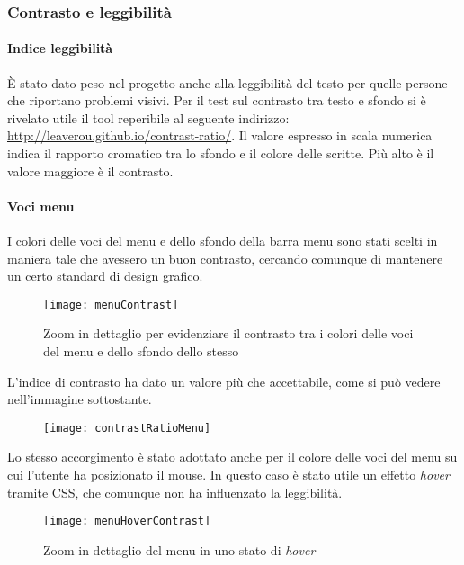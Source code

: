\newpage

\subsubsection{Contrasto e leggibilit\`a}

\paragraph*{Indice leggibilità}\`E stato dato peso nel progetto anche alla leggibilit\`a del testo per quelle persone che riportano problemi visivi. Per il test sul contrasto tra testo e sfondo si \`e rivelato utile il tool reperibile al seguente indirizzo: \url{http://leaverou.github.io/contrast-ratio/}.
Il valore espresso in scala numerica indica il rapporto cromatico tra lo sfondo e il colore delle scritte. Più alto \`e il valore maggiore è il contrasto.

\paragraph*{Voci menu}I colori delle voci del menu e dello sfondo della barra menu sono stati scelti in maniera tale che avessero un buon contrasto, cercando comunque di mantenere un certo standard di design grafico.
\begin{figure}[H]

    \centering
    \texttt{[image: menuContrast]}
    \caption{Zoom in dettaglio per evidenziare il contrasto tra i colori delle voci del menu e dello sfondo dello stesso}

\end{figure}

L'indice di contrasto ha dato un valore più che accettabile, come si pu\`o vedere nell'immagine sottostante.
\begin{figure}[H]

    \centering
    \texttt{[image: contrastRatioMenu]}

\end{figure}


Lo stesso accorgimento è stato adottato anche per il colore delle voci del menu su cui l'utente ha posizionato il mouse. In questo caso \`e stato utile un effetto \textit{hover} tramite CSS, che comunque non ha influenzato la leggibilità.
\begin{figure}[H]

    \centering
    \texttt{[image: menuHoverContrast]}
    \caption{Zoom in dettaglio del menu in uno stato di \textit{hover}}

\end{figure}

